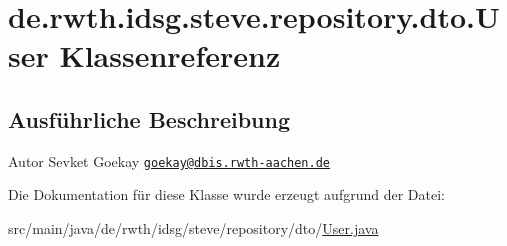 \hypertarget{classde_1_1rwth_1_1idsg_1_1steve_1_1repository_1_1dto_1_1_user}{\section{de.\-rwth.\-idsg.\-steve.\-repository.\-dto.\-User Klassenreferenz}
\label{classde_1_1rwth_1_1idsg_1_1steve_1_1repository_1_1dto_1_1_user}
}


\subsection{Ausführliche Beschreibung}
\begin{DoxyAuthor}{Autor}
Sevket Goekay \href{mailto:goekay@dbis.rwth-aachen.de}{\tt goekay@dbis.\-rwth-\/aachen.\-de} 
\end{DoxyAuthor}


Die Dokumentation für diese Klasse wurde erzeugt aufgrund der Datei\-:\begin{DoxyCompactItemize}
\item 
src/main/java/de/rwth/idsg/steve/repository/dto/\hyperlink{_user_8java}{User.\-java}\end{DoxyCompactItemize}
